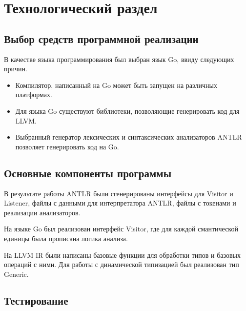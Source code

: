 \chapter{Технологический раздел}


\section{Выбор средств программной реализации}

В качестве языка программирования был выбран язык Go, ввиду следующих причин.
\begin{itemize}
	\item Компилятор, написанный на Go может быть запущен на различных платформах.
	\item Для языка Go существуют библиотеки, позволяющие генерировать код для LLVM.
	\item Выбранный генератор лексических и синтаксических анализаторов ANTLR позволяет генерировать код на Go.
\end{itemize}

\section{Основные компоненты программы}

В результате работы ANTLR были сгенерированы интерфейсы для Visitor и Listener, файлы с данными для интерпретатора ANTLR, файлы с токенами и реализации анализаторов.

На языке Go был реализован интерфейс Visitor, где для каждой смантической единицы была прописана логика анализа. 


На LLVM IR были написаны базовые функции для обработки типов и базовых операций с ними. Для работы с динамической типизацией был реализован тип Generic.



\section{Тестирование}

